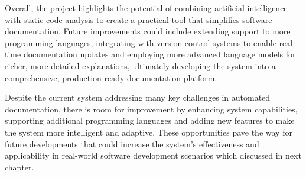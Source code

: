 \par Overall, the project highlights the potential of combining artificial intelligence with static code analysis to create a practical tool that simplifies software documentation. Future improvements could include extending support to more programming languages, integrating with version control systems to enable real-time documentation updates and employing more advanced language models for richer, more detailed explanations, ultimately developing the system into a comprehensive, production-ready documentation platform.
\newline
\par Despite the current system addressing many key challenges in automated documentation, there is room for improvement by enhancing system capabilities, supporting additional programming languages and adding new features to make the system more intelligent and adaptive. These opportunities pave the way for future developments that could increase the system’s effectiveness and applicability in real-world software development scenarios which discussed in next chapter.